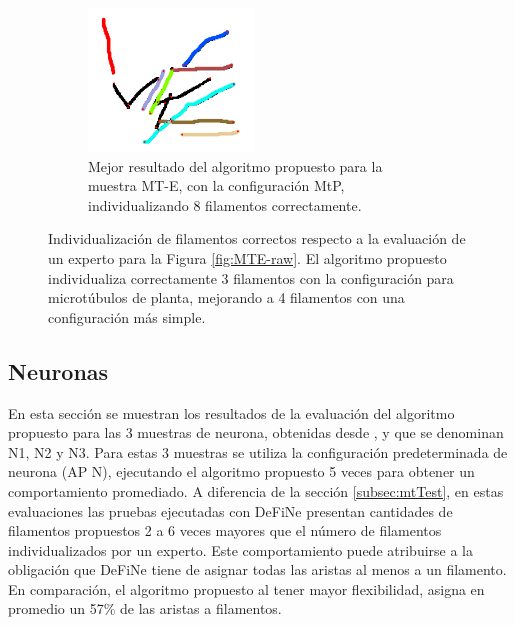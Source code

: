 \begin{figure}[h!]
\begin{subfigure}[t]{0.48\textwidth}
        \label{fig:MTE-best-define}
    \end{subfigure}
    \hspace{0.2cm}
    \begin{subfigure}[t]{0.48\textwidth}
        \centering
        \includegraphics[height=1.5in]{resultImages/field4-t2-phil-s1271-v05-exactMatch-no-label-ants.png}
        \caption{Mejor resultado del algoritmo propuesto para la muestra MT-E, con la configuraci\'on MtP, individualizando 8 filamentos correctamente.}
        \label{fig:MTE-best-phil}
    \end{subfigure}
        
    \caption[Individualizaci\'on de filamentos correctos respecto a la evaluaci\'on de un experto para la Figura \ref{fig:MTE-raw}.]{Individualizaci\'on de filamentos correctos respecto a la evaluaci\'on de un experto para la Figura \ref{fig:MTE-raw}. El algoritmo propuesto individualiza correctamente 3 filamentos con la configuraci\'on para microt\'ubulos de planta, mejorando a 4 filamentos con una configuraci\'on m\'as simple.}
    \label{fig:MTE-results}
\end{figure}

\subsection{Neuronas}
\label{subsec:neuronTest}
En esta secci\'on se muestran los resultados de la evaluaci\'on del algoritmo propuesto para las 3 muestras de neurona, obtenidas desde \citet{ampuero2019chronic}, y que se denominan N1, N2 y N3. Para estas 3 muestras se utiliza la configuraci\'on predeterminada de neurona (AP N), ejecutando el algoritmo propuesto 5 veces para obtener un comportamiento promediado. A diferencia de la secci\'on \ref{subsec:mtTest}, en estas evaluaciones las pruebas ejecutadas con DeFiNe presentan cantidades de filamentos propuestos 2 a 6 veces mayores que el n\'umero de filamentos individualizados por un experto. Este comportamiento puede atribuirse a la obligaci\'on que DeFiNe tiene de asignar todas las aristas al menos a un filamento. En comparaci\'on, el algoritmo propuesto al tener mayor flexibilidad, asigna en promedio un 57\% de las aristas a filamentos.

